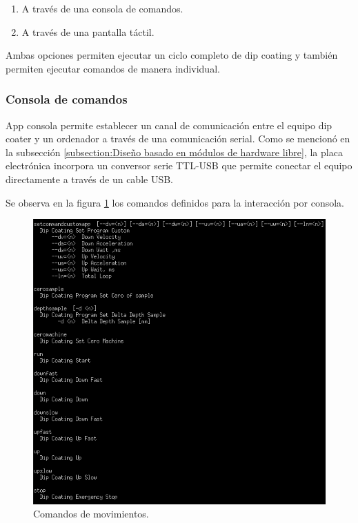 \begin{enumerate}
\item A través de una consola de comandos.
\item A través de una pantalla táctil.
\end{enumerate}

Ambas opciones permiten ejecutar un ciclo completo de dip coating y también permiten ejecutar comandos de manera individual.

\subsubsection{Consola de comandos}

App consola permite establecer un canal de comunicación entre el equipo dip coater y un ordenador a través de una comunicación serial. Como se mencionó en la subsección \ref{subsection:Diseño basado en módulos de hardware libre}, la placa electrónica incorpora un conversor serie TTL-USB que permite conectar el  equipo directamente a través de un cable USB. 

Se observa en la figura \ref{fig:consola_movimientos} los comandos definidos para la interacción por consola.

\begin{figure}[h!]
	\centering
	\includegraphics[width=1\textwidth]{./Figures/consola_2.png}
	\caption{Comandos de movimientos.}
	\label{fig:consola_movimientos}
\end{figure}

